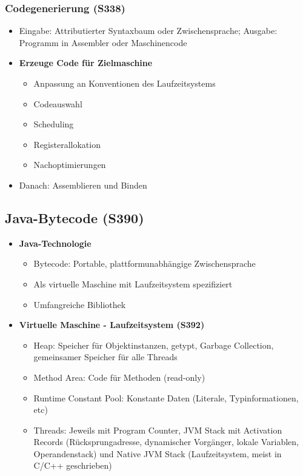 \subsubsection{Codegenerierung (S338)}
\begin{itemize}
	\item Eingabe: Attributierter Syntaxbaum oder Zwischensprache; Ausgabe: Programm in Assembler oder Maschinencode
	\item \textbf{Erzeuge Code für Zielmaschine}
	\begin{itemize}
		\item Anpassung an Konventionen des Laufzeitsystems
		\item Codeauswahl
		\item Scheduling
		\item Registerallokation
		\item Nachoptimierungen
	\end{itemize}
	\item Danach: Assemblieren und Binden
\end{itemize}


\subsection{Java-Bytecode (S390)}
\begin{itemize}
	\item \textbf{Java-Technologie}
	\begin{itemize}
		\item Bytecode: Portable, plattformunabhängige Zwischensprache
		\item Als virtuelle Maschine mit Laufzeitsystem spezifiziert
		\item Umfangreiche Bibliothek
	\end{itemize}
	\item \textbf{Virtuelle Maschine - Laufzeitsystem (S392)}
	\begin{itemize}
		\item Heap: Speicher für Objektinstanzen, getypt, Garbage Collection, gemeinsamer Speicher für alle Threads
		\item Method Area: Code für Methoden (read-only)
		\item Runtime Constant Pool: Konstante Daten (Literale, Typinformationen, etc)
		\item Threads: Jeweils mit Program Counter, JVM Stack mit Activation Records (Rücksprungadresse, dynamischer Vorgänger, lokale Variablen, Operandenstack) und Native JVM Stack (Laufzeitsystem, meist in C/C++ geschrieben) 
	\end{itemize}
\end{itemize}

